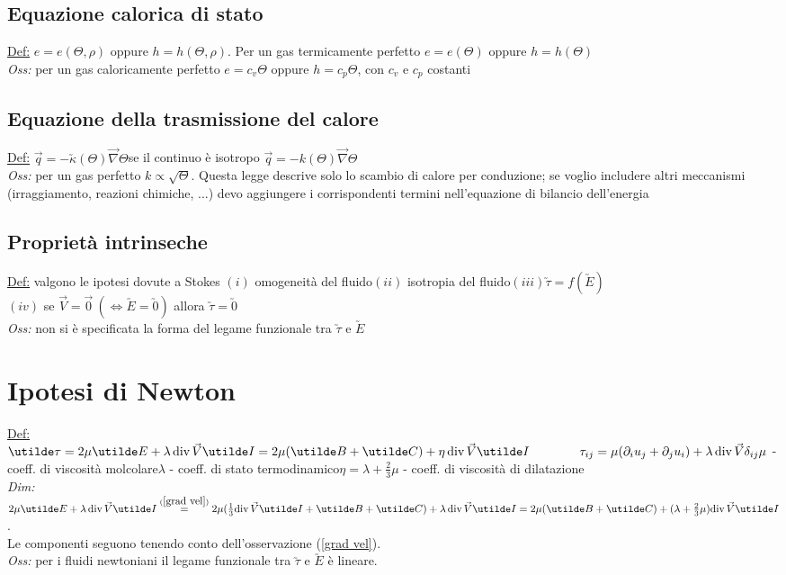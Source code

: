 \documentclass[11pt,a4paper]{report}
\begin{document}
		\subsection{Equazione calorica di stato}
		\underline{Def:} $e=e(\Theta,\rho)$ oppure $h=h(\Theta,\rho)$. Per un gas termicamente perfetto $e=e(\Theta)$ oppure $h=h(\Theta)$\\
		\textit{Oss:} per un gas caloricamente perfetto $e=c_v\Theta$ oppure $h=c_p\Theta$, con $c_v$ e $c_p$ costanti
		\subsection{Equazione della trasmissione del calore}
		\underline{Def:} $\vec q=-\utilde\kappa(\Theta)\vec\nabla\Theta$\qquad se il continuo è isotropo $\vec q=-k(\Theta)\vec\nabla\Theta$\\
		\textit{Oss:} per un gas perfetto $k\propto\sqrt{\Theta}$. Questa legge descrive solo lo scambio di calore per conduzione; se voglio includere altri meccanismi (irraggiamento, reazioni chimiche, ...) devo aggiungere i corrispondenti termini nell'equazione di bilancio dell'energia
		\subsection{Proprietà intrinseche}
		\underline{Def:} valgono le ipotesi dovute a Stokes $(i)$ omogeneità del fluido\quad$(ii)$ isotropia del fluido\quad$(iii)$\phantom{ }$\utilde\tau=f(\utilde E)$\\$(iv)$ se $\vec V=\vec 0\:(\Leftrightarrow\utilde E=\utilde 0)$ allora $\utilde\tau=\utilde 0$\\
		\textit{Oss:} non si è specificata la forma del legame funzionale tra $\utilde\tau$ e $\utilde E$
		
	\section{Ipotesi di Newton}	\label{hp newton}
	\underline{Def:} $\utilde\tau=2\mu\utilde E+\lambda\,\mathrm{div}\,\vec V\utilde I=2\mu(\utilde B+\utilde C)+\eta\,\mathrm{div}\,\vec V\utilde I\qquad\qquad\tau_{ij}=\mu(\partial_iu_j+\partial_ju_i)+\lambda\,\mathrm{div}\,\vec V\delta_{ij}\\\mu$ - coeff. di viscosità molcolare\quad$\lambda$ - coeff. di stato termodinamico\quad$\eta=\lambda+\frac 23\mu$ - coeff. di viscosità di dilatazione\\
	\textit{Dim:} $2\mu\utilde E+\lambda\,\mathrm{div}\,\vec V\utilde I\overset{(\ref{grad vel})}{=}2\mu(\frac 13\mathrm{div}\,\vec V\utilde I+\utilde B+\utilde C)+\lambda\,\mathrm{div}\,\vec V\utilde I=2\mu(\utilde B+\utilde C)+(\lambda+\frac 23\mu)\mathrm{div}\,\vec V\utilde I$.\\Le componenti seguono tenendo conto dell'osservazione (\ref{grad vel}).\\
	\textit{Oss:} per i fluidi newtoniani il legame funzionale tra $\utilde\tau$ e $\utilde E$ è lineare.\\
	\phantom{\qquad}
\end{document}
